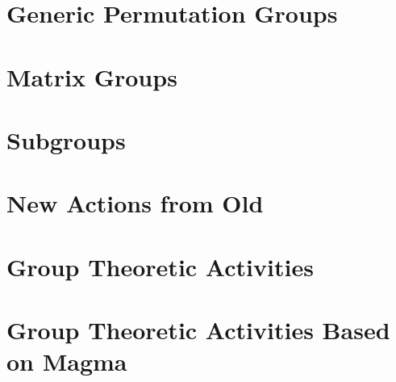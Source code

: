
\section{Generic Permutation Groups}
\label{sec:generic:permutation:groups}



\bigskip





\clearpage




\section{Matrix Groups}
\label{sec:lineargroups}



\bigskip


\clearpage

\section{Subgroups}
\label{sec:subgroups}



\bigskip


\clearpage



\section{New Actions from Old}
\label{sec:induced:actions}



\bigskip


\clearpage

\section{Group Theoretic Activities}
\label{sec:group:theoretic:activities}



\bigskip


\clearpage

\section{Group Theoretic Activities Based on Magma}
\label{sec:group:magma}



